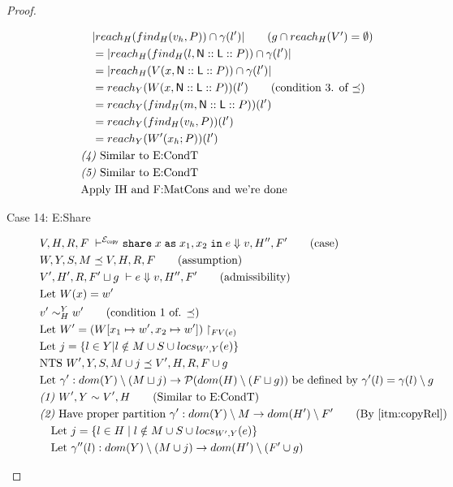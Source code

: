 \documentclass{easychair}
\newcommand{\ms}[1]{\ensuremath{\mathsf{#1}}}
\newcommand{\irl}[1]{\mathtt{#1}}
\newcommand{\sharecpcst}[4]{\irl{share}\;#1\;\irl{as}\;#2,#3\;\irl{in}\;#4}
\newcommand{\veq}[4]{#3 \sim^{#1}_{#2} #4}
\newcommand{\copySem}{\ensuremath{\mathcal{E}_{\ms{copy}}}}
\theoremstyle{definition}
\begin{document}
\begin{proof}
\begin{description}
\begin{align*}
		&\quad |reach_{H}(find_H(v_h,P)) \cap \gamma(l')| \tag{$g \cap reach_H(V') = \emptyset$}\\
		&\quad = |reach_{H}(find_H(l,\ms{N}::\ms{L}::P)) \cap \gamma(l')|\\
		&\quad = |reach_{H}(V(x,\ms{N}::\ms{L}::P)) \cap \gamma(l')|\\
		&\quad = reach_{Y}(W(x,\ms{N}::\ms{L}::P))(l') \tag{condition 3. of $\preceq$}\\
		&\quad = reach_{Y}(find_H(m,\ms{N}::\ms{L}::P))(l') \\
		&\quad = reach_{Y}(find_H(v_h,P))(l') \\
		&\quad = reach_{Y}(W'(x_h;P))(l') \\
		&\emph{(4) } \text{Similar to E:CondT}\\
		&\emph{(5) } \text{Similar to E:CondT}\\
		&\text{Apply IH and F:MatCons and we're done}
  \end{align*}
  \item[Case 14: E:Share]
	\begin{align*}
		&V,H,R,F \; \vdash^{\copySem} \sharecpcst{x}{x_1}{x_2}{e} \Downarrow v,H'',F' \tag{case}\\
		&W,Y,S,M \preceq V,H,R,F \tag{assumption}\\
		&V',H',R,F' \sqcup g \; \vdash e \Downarrow v,H'',F' \tag{admissibility}\\
		&\text{Let } W(x) = w'\\
		&\veq{Y}{H}{v'}{w'} \tag{condition 1 of. $\preceq$}\\
		&\text{Let } W' = (W[x_1 \mapsto w', x_2 \mapsto w'])\restriction_{FV(e)}\\
		&\text{Let } j = \{l \in Y | l \notin M \cup S \cup locs_{W',Y}(e) \}\\
		&\text{NTS } W',Y,S,M \cup j \preceq V',H,R,F \cup g\\
		&\text{Let } \gamma' : dom(Y) \setminus (M \sqcup j) 
		\to \mathcal{P}(dom(H) \setminus (F \sqcup g)) \text{ be defined by } 
		\gamma'(l) = \gamma(l) \setminus g\\
		&\emph{(1) } W',Y \sim V',H \tag{Similar to E:CondT}\\
		&\emph{(2) } \text{Have proper partition } \gamma' : 
			dom(Y) \setminus M \to dom(H') \setminus F' \tag{By $\ref{itm:copyRel}$}\\
		&\quad \text{Let } j = \{l \in H \mid l \notin M \cup S \cup locs_{W',Y}(e)\}\\
		&\quad \text{Let } \gamma''(l) : dom(Y) \setminus (M \cup j) \to dom(H') \setminus (F' \cup g)

\end{align*}
\end{description}
\end{proof}
\end{document}
